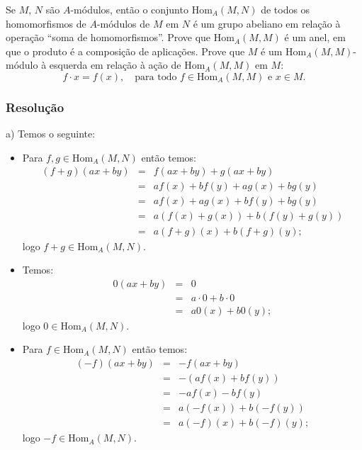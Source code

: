\documentclass[10pt,a4paper]{article}
\begin{document}
Se $M$, $N$ são $A$-módulos, então o conjunto $\mathrm{Hom}_A(M,N)$ de todos os homomorfismos de $A$-módulos de $M$ em $N$ é um grupo abeliano em relação à operação ``soma de homomorfismos''. Prove que $\mathrm{Hom}_A(M,M)$ é um anel, em que o produto é a composição de aplicações. Prove que $M$ é um $\mathrm{Hom}_A(M,M)$-módulo à esquerda em relação à ação de $\mathrm{Hom}_A(M,M)$ em $M$:
\[
f\cdot x=f(x),\quad\text{para todo }f\in\mathrm{Hom}_A(M,M)\text{ e }x\in M.
\]

\subsubsection*{Resolução}

a) Temos o seguinte:
\begin{itemize}
\item Para $f,g\in\mathrm{Hom}_A(M,N)$ então temos:
\[
\begin{array}{rcl}
(f+g)(ax+by)&=&f(ax+by)+g(ax+by)\\&=&af(x)+bf(y)+ag(x)+bg(y)\\&=&af(x)+ag(x)+bf(y)+bg(y)\\&=&a(f(x)+g(x))+b(f(y)+g(y))\\&=&a(f+g)(x)+b(f+g)(y);
\end{array}
\]
logo $f+g\in\mathrm{Hom}_A(M,N)$.
\item Temos:
\[
\begin{array}{rcl}
0(ax+by)&=&0\\&=&a\cdot0+b\cdot0\\&=&a0(x)+b0(y);
\end{array}
\]
logo $0\in\mathrm{Hom}_A(M,N)$.
\item Para $f\in\mathrm{Hom}_A(M,N)$ então temos:
\[
\begin{array}{rcl}
(-f)(ax+by)&=&-f(ax+by)\\&=&-(af(x)+bf(y))\\&=&-af(x)-bf(y)\\&=&a(-f(x))+b(-f(y))\\&=&a(-f)(x)+b(-f)(y);
\end{array}
\]
logo $-f\in\mathrm{Hom}_A(M,N)$.
\end{itemize}
\end{document}
